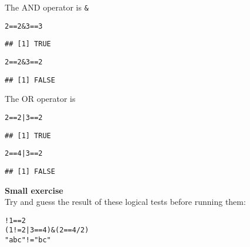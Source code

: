 \documentclass[12pt,a4paper]{scrartcl}\usepackage[]{graphicx}\usepackage[]{color}
\makeatletter
\newcommand{\hlnum}[1]{\textcolor[rgb]{0.686,0.059,0.569}{#1}}%
\newcommand{\hlstr}[1]{\textcolor[rgb]{0.192,0.494,0.8}{#1}}%
\newcommand{\hlopt}[1]{\textcolor[rgb]{0,0,0}{#1}}%
\newcommand{\hlstd}[1]{\textcolor[rgb]{0.345,0.345,0.345}{#1}}%
\newenvironment{kframe}{%
 \def\at@end@of@kframe{}%
 \ifinner\ifhmode%
  \def\at@end@of@kframe{\end{minipage}}%
  \begin{minipage}{\columnwidth}%
 \fi\fi%
 \def\FrameCommand##1{\hskip\@totalleftmargin \hskip-\fboxsep
 \colorbox{shadecolor}{##1}\hskip-\fboxsep
     \hskip-\linewidth \hskip-\@totalleftmargin \hskip\columnwidth}%
 \MakeFramed {\advance\hsize-\width
   \@totalleftmargin\z@ \linewidth\hsize
   \@setminipage}}%
 {\par\unskip\endMakeFramed%
 \at@end@of@kframe}
\newenvironment{knitrout}{}{} %
\makeatother
\begin{document}
The AND operator is \texttt{\&}
\begin{knitrout}
\color{fgcolor}\begin{kframe}
\begin{alltt}
\hlnum{2} \hlopt{==} \hlnum{2} \hlopt{&} \hlnum{3}\hlopt{==}\hlnum{3}
\end{alltt}
\begin{verbatim}
## [1] TRUE
\end{verbatim}
\begin{alltt}
\hlnum{2} \hlopt{==}\hlnum{2} \hlopt{&} \hlnum{3}\hlopt{==}\hlnum{2}
\end{alltt}
\begin{verbatim}
## [1] FALSE
\end{verbatim}
\end{kframe}
\end{knitrout}

The OR operator is \texttt{\textbar}
\begin{knitrout}
\color{fgcolor}\begin{kframe}
\begin{alltt}
\hlnum{2} \hlopt{==} \hlnum{2} \hlopt{|} \hlnum{3}\hlopt{==}\hlnum{2}
\end{alltt}
\begin{verbatim}
## [1] TRUE
\end{verbatim}
\begin{alltt}
\hlnum{2} \hlopt{==} \hlnum{4} \hlopt{|} \hlnum{3}\hlopt{==}\hlnum{2}
\end{alltt}
\begin{verbatim}
## [1] FALSE
\end{verbatim}
\end{kframe}
\end{knitrout}

\begin{mdframed}
\textbf{Small exercise}\\
Try and guess the result of these logical tests before running them:
\begin{knitrout}
\color{fgcolor}\begin{kframe}
\begin{alltt}
\hlopt{!} \hlnum{1}\hlopt{==}\hlnum{2}
\hlstd{(}\hlnum{1}\hlopt{!=}\hlnum{2} \hlopt{|} \hlnum{3}\hlopt{==}\hlnum{4}\hlstd{)} \hlopt{&} \hlstd{(}\hlnum{2}\hlopt{==}\hlnum{4}\hlopt{/}\hlnum{2}\hlstd{)}
\hlstr{"abc"} \hlopt{!=} \hlstr{"bc"}
\end{alltt}
\end{kframe}
\end{knitrout}
\end{mdframed}
\end{document}
